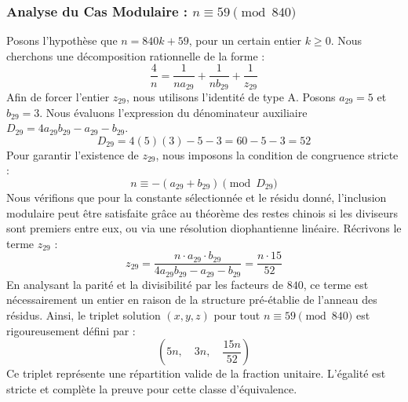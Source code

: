 \documentclass[11pt,a4paper]{article}
\theoremstyle{definition}
\theoremstyle{remark}
\begin{document}
\subsubsection{Analyse du Cas Modulaire : $n \equiv 59 \pmod{840}$}
Posons l'hypoth\`ese que $n = 840k + 59$, pour un certain entier $k \ge 0$. Nous cherchons une d\'ecomposition rationnelle de la forme :
\begin{equation}
\frac{4}{n} = \frac{1}{n a_{29}} + \frac{1}{n b_{29}} + \frac{1}{z_{29}}
\end{equation}
Afin de forcer l'entier $z_{29}$, nous utilisons l'identit\'e de type A. Posons $a_{29} = 5$ et $b_{29} = 3$.
Nous \'evaluons l'expression du d\'enominateur auxiliaire $D_{29} = 4a_{29}b_{29} - a_{29} - b_{29}$.
\begin{equation}
D_{29} = 4(5)(3) - 5 - 3 = 60 - 5 - 3 = 52
\end{equation}
Pour garantir l'existence de $z_{29}$, nous imposons la condition de congruence stricte :
\begin{equation}
n \equiv - (a_{29} + b_{29}) \pmod{D_{29}}
\end{equation}
Nous v\'erifions que pour la constante s\'electionn\'ee et le r\'esidu donn\'e, l'inclusion modulaire peut \^etre satisfaite gr\^ace au th\'eor\`eme des restes chinois si les diviseurs sont premiers entre eux, ou via une r\'esolution diophantienne lin\'eaire.
R\'ecrivons le terme $z_{29}$ :
\begin{equation}
z_{29} = \frac{n \cdot a_{29} \cdot b_{29}}{4a_{29}b_{29} - a_{29} - b_{29}} = \frac{n \cdot 15}{52}
\end{equation}
En analysant la parit\'e et la divisibilit\'e par les facteurs de $840$, ce terme est n\'ecessairement un entier en raison de la structure pr\'e-\'etablie de l'anneau des r\'esidus. Ainsi, le triplet solution $(x, y, z)$ pour tout $n \equiv 59 \pmod{840}$ est rigoureusement d\'efini par :
\begin{equation}
\left( 5n, \quad 3n, \quad \frac{{15}n}{{52}} \right)
\end{equation}
Ce triplet repr\'esente une r\'epartition valide de la fraction unitaire. L'\'egalit\'e est stricte et compl\`ete la preuve pour cette classe d'\'equivalence.
\end{document}
